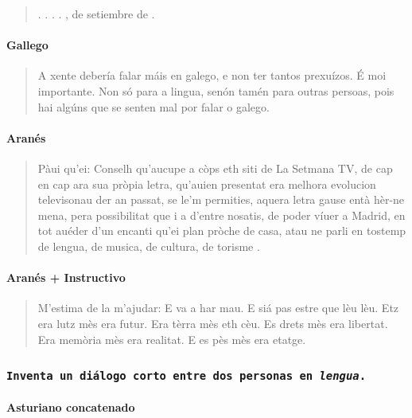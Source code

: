 \begin{quote}
. . . . , de setiembre de .
\end{quote}

\paragraph{Gallego}

\begin{quote}
A xente debería falar máis en galego, e non ter tantos prexuízos. É moi importante. Non só para a lingua, senón tamén para outras persoas, pois hai algúns que se senten mal por falar o galego.
\end{quote}

\paragraph{Aranés}

\begin{quote}
Pàui qu'ei: Conselh qu'aucupe a còps eth siti de La Setmana TV, de cap en cap ara sua pròpia letra, qu'auien presentat era melhora evolucion televisonau der an passat, se le'm permities, aquera letra gause entà hèr-ne mena, pera possibilitat que i a d'entre nosatis, de poder víuer a Madrid, en tot auéder d'un encanti qu'ei plan pròche de casa, atau ne parli en tostemp de lengua, de musica, de cultura, de torisme .
\end{quote}

\paragraph{Aranés + Instructivo}
\begin{quote}
M'estima de la m'ajudar: E va a har mau. E siá pas estre que lèu lèu. Etz era lutz mès era futur. Era tèrra mès eth cèu. Es drets mès era libertat. Era memòria mès era realitat. E es pès mès era etatge.
\end{quote}

\subsubsection{\fontsize{15}{15}\texttt{Inventa un diálogo corto entre dos personas en \textit{lengua}.}}

\paragraph{Asturiano concatenado}

